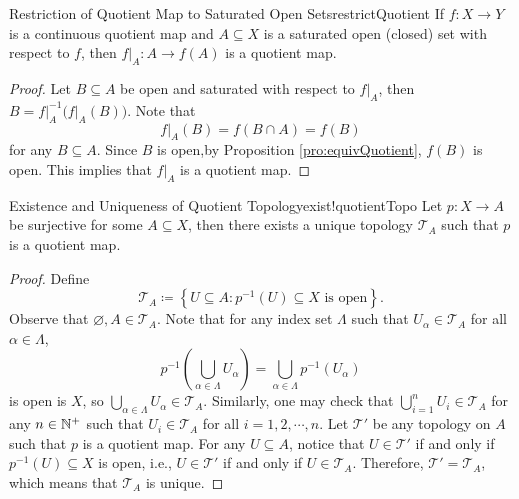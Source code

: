 \documentclass[math]{amznotes}
\theoremstyle{remark}
\begin{document}
\begin{probox}{Restriction of Quotient Map to Saturated Open Sets}{restrictQuotient}
    If $f \colon X \to Y$ is a continuous quotient map and $A \subseteq X$ is a saturated open (closed) set with respect to $f$, then $\left.f\right\rvert_A \colon A \to f\left(A\right)$ is a quotient map.
    \tcblower
    \begin{proof}
        Let $B \subseteq A$ be open and saturated with respect to $\left.f\right\rvert_A$, then $B = \left.f\right\rvert_A^{-1}\bigl(\left.f\right\rvert_A\left(B\right)\bigr)$. Note that 
        \begin{equation*}
            \left.f\right\rvert_A\left(B\right) = f\left(B \cap A\right) = f\left(B\right)
        \end{equation*}
        for any $B \subseteq A$. Since $B$ is open,by Proposition \ref{pro:equivQuotient}, $f\left(B\right)$ is open. This implies that $\left.f\right\rvert_A$ is a quotient map.
    \end{proof}
\end{probox}
\begin{probox}{Existence and Uniqueness of Quotient Topology}{exist!quotientTopo}
    Let $p \colon X \to A$ be surjective for some $A \subseteq X$, then there exists a unique topology $\mathcal{T}_A$ such that $p$ is a quotient map.
    \tcblower
    \begin{proof}
        Define 
        \begin{equation*}
            \mathcal{T}_A \coloneqq \left\{U \subseteq A \colon p^{-1}\left(U\right) \subseteq X \textrm{ is open}\right\}.
        \end{equation*}
        Observe that $\varnothing, A \in \mathcal{T}_A$. Note that for any index set $\Lambda$ such that $U_{\alpha} \in \mathcal{T}_A$ for all $\alpha \in \Lambda$,
        \begin{equation*}
            p^{-1}\left(\bigcup_{\alpha \in \Lambda}U_{\alpha}\right) = \bigcup_{\alpha \in \Lambda}p^{-1}\left(U_{\alpha}\right)
        \end{equation*}
        is open is $X$, so $\bigcup_{\alpha \in \Lambda}U_{\alpha} \in \mathcal{T}_A$. Similarly, one may check that $\bigcup_{i = 1}^nU_{i} \in \mathcal{T}_A$ for any $n \in \mathbb{N}^+$ such that $U_i \in \mathcal{T}_A$ for all $i = 1, 2, \cdots, n$. Let $\mathcal{T}'$ be any topology on $A$ such that $p$ is a quotient map. For any $U \subseteq A$, notice that $U \in \mathcal{T}'$ if and only if $p^{-1}\left(U\right) \subseteq X$ is open, i.e., $U \in \mathcal{T}'$ if and only if $U \in \mathcal{T}_A$. Therefore, $\mathcal{T}' = \mathcal{T}_A$, which means that $\mathcal{T}_A$ is unique.
    \end{proof}
\end{probox}
\end{document}
